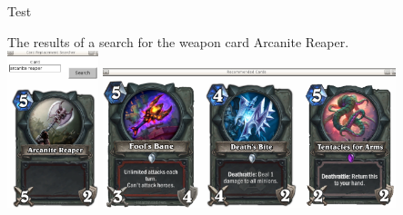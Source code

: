 \documentclass[aspectratio=169]{beamer}
\begin{document}
\begin{frame}[allowframebreaks]{Test}
\pagebreak

The results of a search for the weapon card Arcanite Reaper.
\\
\includegraphics[height=1.8in]{arcanite}
\includegraphics[height=1.6in]{arcaniteresults}

\end{frame}
\end{document}
